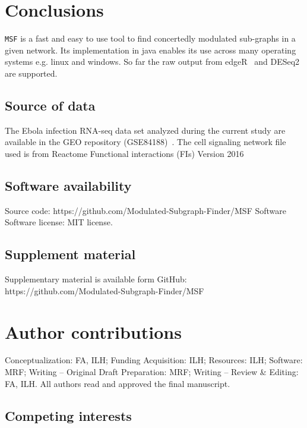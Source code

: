 \documentclass[10pt,a4paper,twocolumn]{article}
\begin{document}
	
	\section*{Conclusions}
	
	
	\texttt{MSF} is a fast and easy to use tool to find
        concertedly modulated sub-graphs in a given network. Its
        implementation in java enables its use across many operating
        systems e.g. linux and windows. So far the raw output from
        edgeR~\cite{edgeR} and DESeq2~\cite{love2014moderated} are
        supported.
	
	\subsection*{Source of data}
	
	The Ebola infection RNA-seq data set analyzed during the
        current study are available in the GEO repository
        (GSE84188)~\cite{Olejnik}. The cell signaling network file
        used is from Reactome Functional interactions (FIs) Version
        2016~\cite{Cytokegg}
	
	\subsection*{Software availability}
	
	\noindent
	Source code: \newline
	https://github.com/Modulated-Subgraph-Finder/MSF \newline Software
	Software license: MIT license.
	
	\subsection*{Supplement material}
	Supplementary material is available form GitHub: https://github.com/Modulated-Subgraph-Finder/MSF
	
	\section*{Author contributions}
	Conceptualization: FA, ILH; Funding Acquisition: ILH; Resources: ILH;
	Software: MRF; Writing – Original Draft Preparation: MRF; Writing – Review
	\& Editing: FA, ILH. All authors read and approved the final manuscript.
	
	\subsection*{Competing interests}
	
\end{document}
